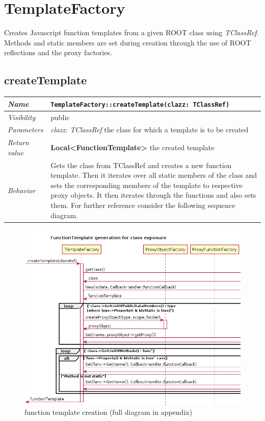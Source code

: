 \chapter{TemplateFactory}
Creates Javascript function templates from a given ROOT class using \textit{TClassRef}. Methods and static members are set during creation through the use of ROOT reflections and the proxy factories.

\section{createTemplate}
\begin{longtable}{p{3cm} @{\hskip 1cm} p{12cm}}
 \hline
\textit{Name} & \texttt{TemplateFactory::createTemplate(clazz: TClassRef)}\\
\hline
 \textit{Visibility} & public\\
\hline
\textit{Parameters} & \textit{clazz: TClassRef} the class for which a template is to be created \\
\hline
\textit{Return value} & \textbf{Local<FunctionTemplate>} the created template\\
  \hline
 \textit{Behavior} & Gets the class from TClassRef and creates a new function template.
			Then it iterates over all static members of the class and sets the
			corresponding members of the template to respective proxy objects.
			It then iterates through the functions and also sets them.
			For further reference consider the following sequence diagram.\\
\hline
\end{longtable} \pagebreak

\begin{figure}[htb]
\includegraphics[width=16cm]{./latex/resources/functionTemplateGenerateCrop.png}
	\caption{function template creation (full diagram in appendix)}
\end{figure}
